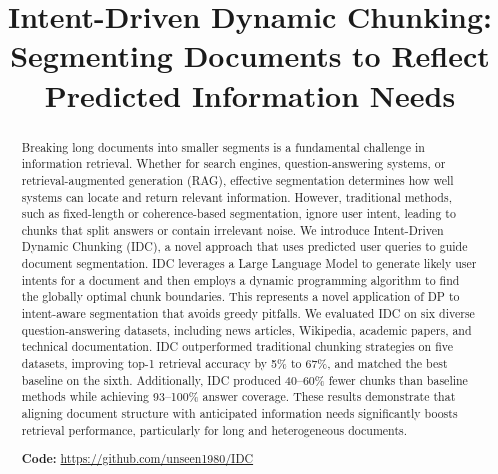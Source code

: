 \documentclass[conference]{IEEEtran}
\begin{document}
\title{Intent-Driven Dynamic Chunking: Segmenting Documents to Reflect Predicted Information Needs}

\author{
}

\maketitle

\begin{abstract}
Breaking long documents into smaller segments is a fundamental challenge in information retrieval. Whether for search engines, question-answering systems, or retrieval-augmented generation (RAG), effective segmentation determines how well systems can locate and return relevant information. However, traditional methods, such as fixed-length or coherence-based segmentation, ignore user intent, leading to chunks that split answers or contain irrelevant noise. We introduce Intent-Driven Dynamic Chunking (IDC), a novel approach that uses predicted user queries to guide document segmentation. IDC leverages a Large Language Model to generate likely user intents for a document and then employs a dynamic programming algorithm to find the globally optimal chunk boundaries. This represents a novel application of DP to intent-aware segmentation that avoids greedy pitfalls. We evaluated IDC on six diverse question-answering datasets, including news articles, Wikipedia, academic papers, and technical documentation. IDC outperformed traditional chunking strategies on five datasets, improving top-1 retrieval accuracy by 5\% to 67\%, and matched the best baseline on the sixth. Additionally, IDC produced 40--60\% fewer chunks than baseline methods while achieving 93--100\% answer coverage. These results demonstrate that aligning document structure with anticipated information needs significantly boosts retrieval performance, particularly for long and heterogeneous documents.

\vspace{0.3em}
\noindent\textbf{Code:} \url{https://github.com/unseen1980/IDC}
\end{abstract}
\end{document}
